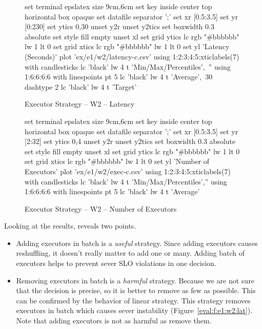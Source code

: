 \begin{figure}[H]
\begin{minipage}[h]{0.5\linewidth}
\begin{gnuplot}[terminal=epslatex, terminaloptions=color colortext]
			set terminal epslatex size 9cm,6cm
			set key inside center top horizontal box opaque
			set datafile separator ';'
			set xr [0.5:3.5]
			set yr [0:230]
			set ytics 0,30
            unset y2r
			unset y2tics
			set boxwidth 0.3 absolute
			set style fill empty
			unset xl
            set grid ytics lc rgb "#bbbbbb" lw 1 lt 0
            set grid xtics lc rgb "#bbbbbb" lw 1 lt 0
			set yl 'Latency (Seconds)'
			plot 'ex/e1/w2/latency-c.csv' using 1:2:3:4:5:xticlabels(7) with candlesticks lc 'black' lw 4 t 'Min/Max/Percentiles',\
			'' using 1:6:6:6:6 with linespoints pt 5 lc 'black' lw 4 t 'Average',\
            30 dashtype 2 lc 'black' lw 4 t 'Target'
		\end{gnuplot}
		\caption{Executor Strategy -- W2 -- Latency}
		\label{eval:f:e1:w2:lat-c}
	\end{minipage}\hfil
    \begin{minipage}[h]{0.5\linewidth}
        \centering
        \begin{gnuplot}[terminal=epslatex, terminaloptions=color colortext]
            set terminal epslatex size 9cm,6cm
            set key inside center top horizontal box opaque
            set datafile separator ';'
            set xr [0.5:3.5]
            set yr [2:32]
            set ytics 0,4
            unset y2r
            unset y2tics
            set boxwidth 0.3 absolute
            set style fill empty
            unset xl
            set grid ytics lc rgb "#bbbbbb" lw 1 lt 0
            set grid xtics lc rgb "#bbbbbb" lw 1 lt 0
            set yl 'Number of Executors'
            plot 'ex/e1/w2/exec-c.csv' using 1:2:3:4:5:xticlabels(7) with candlesticks lc 'black' lw 4 t 'Min/Max/Percentiles','' using 1:6:6:6:6 with linespoints pt 5 lc 'black' lw 4 t 'Average' 
        \end{gnuplot}
        \caption{Executor Strategy -- W2 -- Number of Executors}
        \label{eval:f:e1:w2:exec-c}
    \end{minipage}
\end{figure}
\noindent Looking at the results, reveals two points.
\begin{itemize}
    \item Adding executors in batch is a \emph{useful} strategy. Since adding executors causes reshuffling, it doesn't really matter to add one or many. Adding batch of executors helps to prevent sever SLO violations in one decision.
    \item Removing executors in batch is a \emph{harmful} strategy. Because we are not sure that the decision is precise, so it is better to remove as few as possible. This can be confirmed by the behavior of linear strategy. This strategy removes executors in batch which causes sever instability (Figure~\ref{eval:f:e1:w2:lat}). Note that adding executors is not as harmful as remove them.
\end{itemize}
